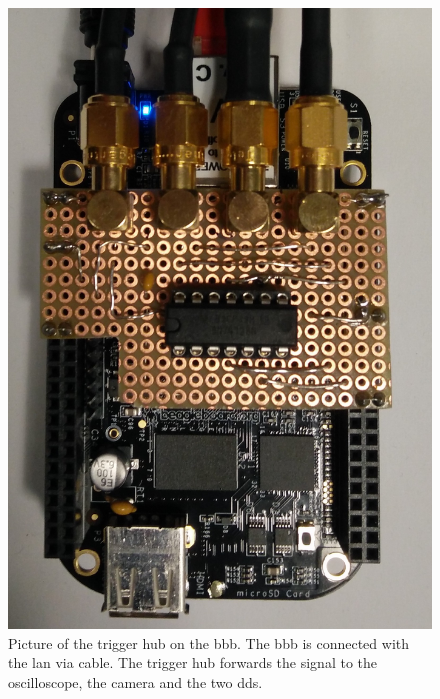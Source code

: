 \begin{figure}[h]
\begin{minipage}{.50\textwidth}
    \includegraphics[width=.6\linewidth]{images/circuits/line-driver/board.jpg}
    \captionsetup{width=.8\linewidth}
    \caption{Picture of the trigger hub on the \gls{bbb}. The \gls{bbb} is
connected with the \gls{lan} via cable. The trigger hub forwards the signal
to the oscilloscope, the camera and the two \gls{dds}.}
  \end{minipage}
\end{figure}
